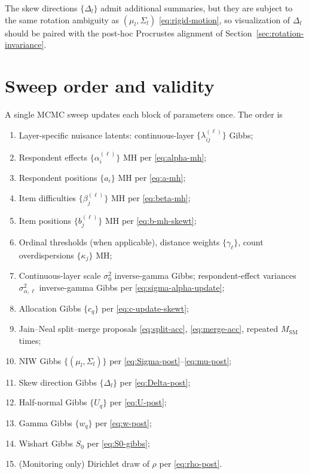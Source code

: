 \documentclass[11pt]{article}
\begin{document}
The skew directions $\{\Delta_l\}$ admit additional summaries, but they
are subject to the same rotation ambiguity as $(\mu_l,\Sigma_l)$
\eqref{eq:rigid-motion}, so visualization of $\Delta_l$ should be paired
with the post-hoc Procrustes alignment of
Section~\ref{sec:rotation-invariance}.

\section{Sweep order and validity}
\label{sec:sweep}

A single MCMC sweep updates each block of parameters once.  The order is
\begin{enumerate}[label=(\arabic*),leftmargin=2em]
    \item Layer-specific nuisance latents: continuous-layer
    $\{\lambda_{ij}^{(\ell)}\}$ Gibbs;
    \item Respondent effects $\{\alpha_i^{(\ell)}\}$ MH per \eqref{eq:alpha-mh};
    \item Respondent positions $\{a_i\}$ MH per \eqref{eq:a-mh};
    \item Item difficulties $\{\beta_j^{(\ell)}\}$ MH per \eqref{eq:beta-mh};
    \item Item positions $\{b_j^{(\ell)}\}$ MH per \eqref{eq:b-mh-skewt};
    \item Ordinal thresholds (when applicable), distance weights
    $\{\gamma_\ell\}$, count overdispersions $\{\kappa_j\}$ MH;
    \item Continuous-layer scale $\sigma_0^2$ inverse-gamma Gibbs;
    respondent-effect variances $\sigma_{\alpha,\ell}^{2}$ inverse-gamma
    Gibbs per \eqref{eq:sigma-alpha-update};
    \item Allocation Gibbs $\{c_q\}$ per \eqref{eq:c-update-skewt};
    \item Jain--Neal split--merge proposals
    \eqref{eq:split-acc}, \eqref{eq:merge-acc}, repeated $M_{\mathrm{SM}}$
    times;
    \item NIW Gibbs $\{(\mu_l,\Sigma_l)\}$ per
    \eqref{eq:Sigma-post}--\eqref{eq:mu-post};
    \item Skew direction Gibbs $\{\Delta_l\}$ per \eqref{eq:Delta-post};
    \item Half-normal Gibbs $\{U_q\}$ per \eqref{eq:U-post};
    \item Gamma Gibbs $\{w_q\}$ per \eqref{eq:w-post};
    \item Wishart Gibbs $S_0$ per \eqref{eq:S0-gibbs};
    \item (Monitoring only) Dirichlet draw of $\rho$ per \eqref{eq:rho-post}.
\end{enumerate}
\end{document}
